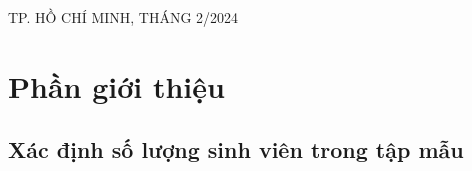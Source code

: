 \documentclass[a4paper]{article}
\begin{document}
\begin{titlepage}
    \begin{center}

        {\footnotesize TP. HỒ CHÍ MINH, THÁNG 2/2024}
    \end{center}
\end{titlepage}


\thispagestyle{empty}

\newpage
\tableofcontents
\newpage



\section{Phần giới thiệu}
\subsection{Xác định số lượng sinh viên trong tập mẫu}
\end{document}
